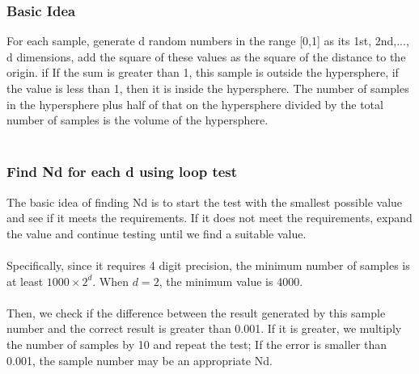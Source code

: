 \documentclass{article}
\begin{document}
			\subsubsection*{Basic Idea}
			For each sample, generate d random numbers in the range [0,1] as its 1st, 2nd,..., d dimensions, add the square of these values as the square of the distance to the origin. if If the sum is greater than 1, this sample is outside the hypersphere, if the value is less than 1, then it is inside the hypersphere. The number of samples in the hypersphere plus half of that on the hypersphere divided by the total number of samples is the volume of the hypersphere.
			\\
			\\
			\subsubsection*{Find Nd for each d using loop test}
			The basic idea of finding Nd is to start the test with the smallest possible value and see if it meets the requirements. If it does not meet the requirements, expand the value and continue testing until we find a suitable value.
			\\
			\\
			Specifically, since it requires 4 digit precision, the minimum number of samples is at least $1000\times2^d$. When $d=2$, the minimum value is 4000.
			\\
			\\
			Then, we check if the difference between the result generated by this sample number and the correct result is greater than 0.001. If it is greater, we multiply the number of samples by 10 and repeat the test; If the error is smaller than 0.001, the sample number may be an appropriate Nd. 
			\\
\end{document}
